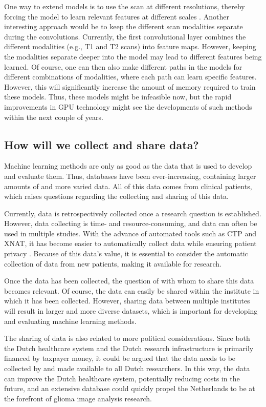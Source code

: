 One way to extend models is to use the scan at different resolutions, thereby forcing the model to learn relevant features at different scales \autocite{akkus20171p19q}.
Another interesting approach would be to keep the different scan modalities separate during the convolutions.
Currently, the first convolutional layer combines the different modalities (e.g., \acrlong{T1} and \acrlong{T2} scans) into feature maps.
However, keeping the modalities separate deeper into the model may lead to different features being learned.
Of course, one can then also make different paths in the models for different combinations of modalities, where each path can learn specific features.
However, this will significantly increase the amount of memory required to train these models.
Thus, these models might be infeasible now, but the rapid improvements in GPU technology might see the developments of such methods within the next couple of years.



\subsection{How will we collect and share data?}

Machine learning methods are only as good as the data that is used to develop and evaluate them.
Thus, databases have been ever-increasing, containing larger amounts of and more varied data.
All of this data comes from clinical patients, which raises questions regarding the collecting and sharing of this data.

Currently, data is retrospectively collected once a research question is established.
However, data collecting is time- and resource-consuming, and data can often be used in multiple studies.
With the advance of automated tools such as CTP and XNAT, it has become easier to automatically collect data while ensuring patient privacy \autocite{marcus2007xnat}.
Because of this data's value, it is essential to consider the automatic collection of data from new patients, making it available for research.

Once the data has been collected, the question of with whom to share this data becomes relevant.
Of course, the data can easily be shared within the institute in which it has been collected.
However, sharing data between multiple institutes will result in larger and more diverse datasets, which is important for developing and evaluating machine learning methods.

The sharing of data is also related to more political considerations.
Since both the Dutch healthcare system and the Dutch research infrastructure is primarily financed by taxpayer money, it could be argued that the data needs to be collected by and made available to all Dutch researchers.
In this way, the data can improve the Dutch healthcare system, potentially reducing costs in the future, and an extensive database could quickly propel the Netherlands to be at the forefront of glioma image analysis research.

